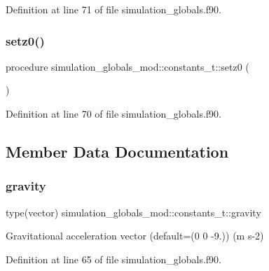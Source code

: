 Definition at line 71 of file simulation\+\_\+globals.\+f90.

\mbox{\label{structsimulation__globals__mod_1_1constants__t_a0ad20f9a9b8c4fd0a6813415e690353a}} 
\subsubsection{\texorpdfstring{setz0()}{setz0()}}
{\footnotesize\ttfamily procedure simulation\+\_\+globals\+\_\+mod\+::constants\+\_\+t\+::setz0 (\begin{DoxyParamCaption}{ }\end{DoxyParamCaption})\hspace{0.3cm}{\ttfamily [private]}}



Definition at line 70 of file simulation\+\_\+globals.\+f90.



\subsection{Member Data Documentation}
\mbox{\label{structsimulation__globals__mod_1_1constants__t_ab1d29ee73044e2bb7b47ca302e2cfdf9}} 
\subsubsection{\texorpdfstring{gravity}{gravity}}
{\footnotesize\ttfamily type(vector) simulation\+\_\+globals\+\_\+mod\+::constants\+\_\+t\+::gravity\hspace{0.3cm}{\ttfamily [private]}}



Gravitational acceleration vector (default=(0 0 -\/9.)) (m s-\/2) 



Definition at line 65 of file simulation\+\_\+globals.\+f90.


